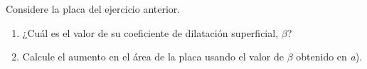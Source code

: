 
Considere la placa del ejercicio anterior.
\begin{enumerate}
    \item ¿Cuál es el valor de su coeficiente de dilatación superficial, $\beta$?
    \item Calcule el aumento en el área de la placa usando el valor de $\beta$ obtenido en \textit{a}).
\end{enumerate}